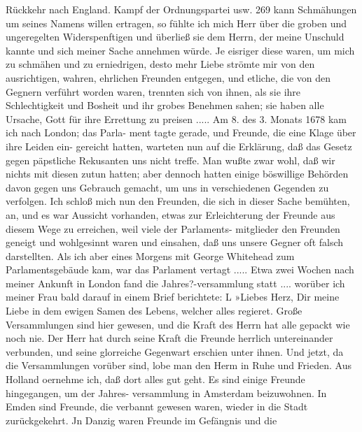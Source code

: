 Rückkehr nach England. Kampf der Ordnungspartei usw. 269
kann Schmähungen um seines Namens willen ertragen, so fühlte
ich mich Herr über die groben und ungeregelten Widerspenftigen
und überließ sie dem Herrn, der meine Unschuld kannte und sich
meiner Sache annehmen würde. Je eisriger diese waren, um
mich zu schmähen und zu erniedrigen, desto mehr Liebe strömte
mir von den ausrichtigen, wahren, ehrlichen Freunden entgegen,
und etliche, die von den Gegnern verführt worden waren, trennten
sich von ihnen, als sie ihre Schlechtigkeit und Bosheit und ihr
grobes Benehmen sahen; sie haben alle Ursache, Gott für ihre
Errettung zu preisen .....
Am 8. des 3. Monats 1678 kam ich nach London; das Parla-
ment tagte gerade, und Freunde, die eine Klage über ihre Leiden ein-
gereicht hatten, warteten nun auf die Erklärung, daß das Gesetz
gegen päpstliche Rekusanten uns nicht treffe. Man wußte zwar
wohl, daß wir nichts mit diesen zutun hatten; aber dennoch
hatten einige böswillige Behörden davon gegen uns Gebrauch
gemacht, um uns in verschiedenen Gegenden zu verfolgen. Ich
schloß mich nun den Freunden, die sich in dieser Sache bemühten,
an, und es war Aussicht vorhanden, etwas zur Erleichterung der
Freunde aus diesem Wege zu erreichen, weil viele der Parlaments-
mitglieder den Freunden geneigt und wohlgesinnt waren und
einsahen, daß uns unsere Gegner oft falsch darstellten. Als ich
aber eines Morgens mit George Whitehead zum Parlamentsgebäude
kam, war das Parlament vertagt .....
Etwa zwei Wochen nach meiner Ankunft in London fand
die Jahres?-versammlung statt .... worüber ich meiner Frau
bald darauf in einem Brief berichtete: L
»Liebes Herz,
Dir meine Liebe in dem ewigen Samen des Lebens, welcher
alles regieret. Große Versammlungen sind hier gewesen, und die
Kraft des Herrn hat alle gepackt wie noch nie. Der Herr hat
durch seine Kraft die Freunde herrlich untereinander verbunden,
und seine glorreiche Gegenwart erschien unter ihnen. Und jetzt,
da die Versammlungen vorüber sind, lobe man den Herm in
Ruhe und Frieden. Aus Holland oernehme ich, daß dort alles
gut geht. Es sind einige Freunde hingegangen, um der Jahres-
versammlung in Amsterdam beizuwohnen. In Emden sind
Freunde, die verbannt gewesen waren, wieder in die Stadt
zurückgekehrt. Jn Danzig waren Freunde im Gefängnis und die

